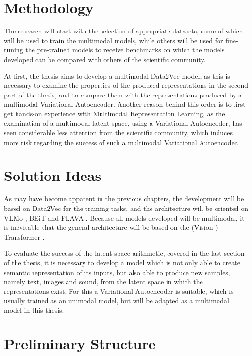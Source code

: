 \section{Methodology}
The research will start with the selection of appropriate datasets, some of which will be used to
train the multimodal models, while others will be used for fine-tuning the pre-trained models to receive
benchmarks on which the models developed can be compared with others of the scientific community.

At first, the thesis aims to develop a multimodal Data2Vec model, as this is necessary
to examine the properties of the produced representations in the second part of the thesis, and to compare
them with the representations produced by a multimodal Variational Autoencoder.
Another reason behind this order is to first get hands-on experience with Multimodal Representation Learning,
as the examination of a multimodal latent space, using a Variational Autoencoder, has seen considerable less
attention from the scientific community, which induces more risk regarding the success of such a multimodal
Variational Autoencoder.

\section{Solution Ideas}
As may have become apparent in the previous chapters, the development will be based on Data2Vec \cite{baevski}
for the training tasks, and the architecture will be oriented on VLMo \cite{bao}, BEiT \cite{wang} and FLAVA \cite{singh}.
Because all models developed will be multimodal, it is inevitable that the general architecture will be
based on the (Vision \cite{dosovitskiy}) Transformer \cite{vaswani}.

To evaluate the success of the latent-space arithmetic, covered in the last section of the thesis, it is necessary
to develop a model which is not only able to create semantic representation of its inputs, but also able to
produce new samples, namely text, images and sound, from the latent space in which the representations exist.
For this a Variational Autoencoder is suitable, which is usually trained as an unimodal model, but will be
adapted as a multimodal model in this thesis.

\section{Preliminary Structure}

